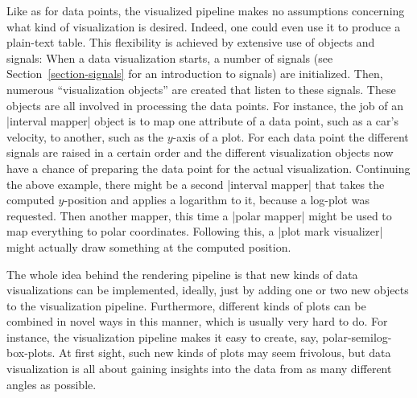 Like as for data points, the visualized pipeline makes no assumptions
concerning what kind of visualization is desired. Indeed, one could even use
it to produce a plain-text table. This flexibility is achieved by
extensive use of objects and signals: When a data visualization
starts, a number of signals (see Section~\ref{section-signals} for an
introduction to signals) are initialized. Then, numerous
``visualization objects'' are created that listen to these
signals. These objects are all involved in processing the data
points. For instance, the job of an |interval mapper| object is to
map one attribute of a data point, such as a car's velocity, to
another, such as the $y$-axis of a plot. For each data point the
different signals are raised in a certain order and the different
visualization objects now have a chance of preparing the data point
for the actual visualization. Continuing the above example, there
might be a second |interval mapper| that takes the computed
$y$-position and applies a logarithm to it, because a log-plot was
requested. Then another mapper, this time a |polar mapper| might be
used to map everything to polar coordinates. Following this, a
|plot mark visualizer| might actually draw something at the computed
position.

The whole idea behind the rendering pipeline is that new kinds of data
visualizations can be implemented, ideally, just by adding one or two
new objects to the visualization pipeline. Furthermore, different
kinds of plots can be combined in novel ways in this manner, which is
usually very hard to do. For instance, the visualization pipeline
makes it easy to create, say, polar-semilog-box-plots. At first sight,
such new kinds of plots may seem frivolous, but data visualization
is all about gaining insights into the data from as many different
angles as possible.

